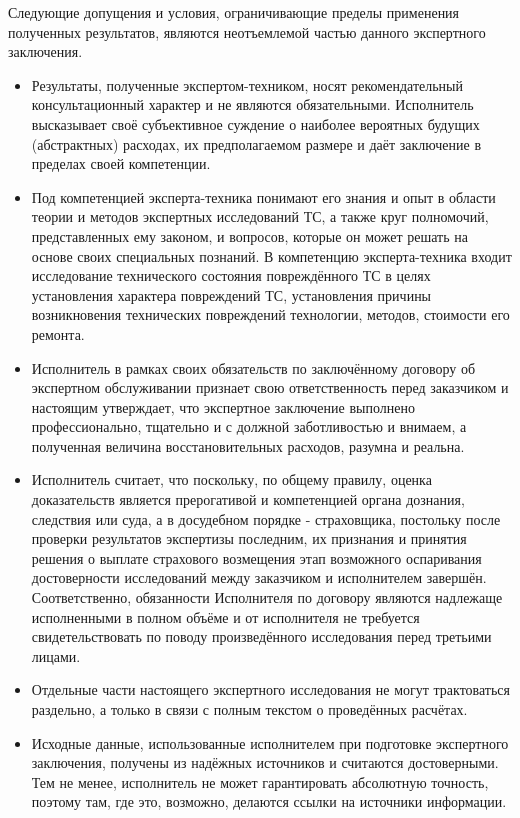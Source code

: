 Следующие допущения и условия, ограничивающие пределы применения полученных результатов, являются неотъемлемой частью данного экспертного заключения.
\begin{itemize}
\item  {Результаты, полученные экспертом-техником, носят рекомендательный консультацион\-ный характер и не являются обязательными. Исполнитель высказывает своё субъективное суждение о наиболее вероятных будущих (абстрактных) расходах, их предполагаемом размере и даёт заключение в пределах своей компетенции.}
\item { Под компетенцией эксперта-техника понимают его знания и опыт в области теории и методов экспертных исследований ТС, а также круг полномочий, представленных ему законом, и вопросов, которые он может решать на основе своих специальных познаний.
В компетенцию эксперта-техника входит исследование технического состояния повреждённого ТС в целях установления характера повреждений ТС, установления причины возникновения технических повреждений технологии, методов, стоимости его ремонта.}
\item  {Исполнитель в рамках своих обязательств по заключённому договору об экспертном обслуживании признает свою ответственность перед заказчиком и настоящим утверждает, что экспертное заключение выполнено профессионально, тщательно и с должной заботливостью и внимаем, %
а полученная величина восстановительных расходов, разумна и реальна.}
\item  {Исполнитель считает, что поскольку, по общему правилу, оценка доказательств является прерогативой и компетенцией органа дознания, следствия или суда, а в досудебном порядке - страховщика, постольку после проверки результатов экспертизы последним, их признания и принятия решения о выплате страхового возмещения этап возможного оспаривания достоверности исследований между заказчиком и исполнителем завершён.
Соответственно, обязанности Исполнителя по договору являются надлежаще исполненными в полном объёме и от исполнителя не требуется свидетельствовать по поводу произведённого исследования перед третьими лицами.}
\item  {Отдельные части настоящего экспертного исследования не могут трактоваться раздельно, а только в связи с полным текстом о проведённых расчётах.}
\item  {Исходные данные, использованные исполнителем при подготовке экспертного заключения, получены из надёжных источников и считаются достоверными. Тем не менее, исполнитель не может гарантировать абсолютную точность, поэтому там, где это, возможно, делаются ссылки на источники информации.}

\end{itemize}
